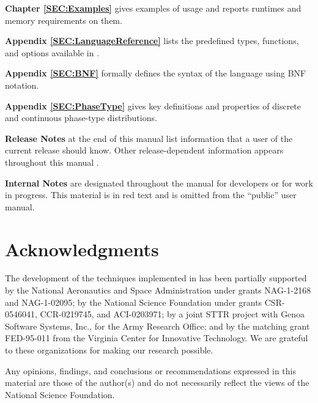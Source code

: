 \begin{description}
\item{\bf Chapter \ref{SEC:Examples}}
gives examples of {\smart} usage and reports runtimes and memory requirements
on them.

\item{\bf Appendix \ref{SEC:LanguageReference}}
lists the predefined types, functions, and options available in \smart.

\item{\bf Appendix \ref{SEC:BNF}}
formally defines the syntax of the {\smart} language using BNF notation.

\item{\bf Appendix \ref{SEC:PhaseType}}
gives key definitions and properties of
discrete and continuous phase-type distributions.

\item{\bf Release Notes}
at the end of this manual list information that a user of the current
release should know.
Other release-dependent information appears throughout this manual
.

\begin{developer}
\item{\bf Internal Notes}
are designated throughout the manual for \smart{} developers or for 
work in progress.
This material is in red text and is omitted from the ``public'' user manual.
\end{developer}

\end{description}

\vfill

\section*{\centering Acknowledgments}

The development of the techniques implemented in {\smart} has been partially
supported by the
National Aeronautics and Space Administration under grants
NAG-1-2168 and NAG-1-02095;
by the National Science Foundation under grants 
CSR-0546041, %
CCR-0219745, 
and
ACI-0203971;
by a joint STTR project with Genoa Software Systems,
Inc., for the Army Research Office;
and by the matching grant FED-95-011 from the Virginia Center for
Innovative Technology.
We are grateful to these organizations for making our research possible.

Any opinions, findings, and conclusions or recommendations expressed in this
material are those of the author(s) and do not necessarily reflect the views
of the National Science Foundation.

